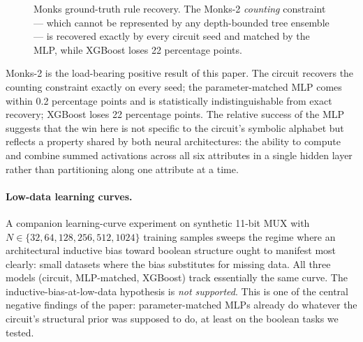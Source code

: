 \documentclass{article}
\begin{document}
\begin{figure}[H]
\centering
{}
\caption{Monks ground-truth rule recovery. The Monks-2 \emph{counting} constraint --- which cannot be represented by any depth-bounded tree ensemble --- is recovered exactly by every circuit seed and matched by the MLP, while XGBoost loses 22 percentage points.}
\label{fig:monks_bar}
\end{figure}

Monks-2 is the load-bearing positive result of this paper.
The circuit recovers the counting constraint exactly on every seed; the parameter-matched MLP comes within 0.2 percentage points and is statistically indistinguishable from exact recovery; XGBoost loses 22 percentage points.
The relative success of the MLP suggests that the win here is not specific to the circuit's symbolic alphabet but reflects a property shared by both neural architectures: the ability to compute and combine summed activations across all six attributes in a single hidden layer rather than partitioning along one attribute at a time.

\paragraph{Low-data learning curves.}
A companion learning-curve experiment on synthetic 11-bit MUX with $N \in \{32, 64, 128, 256, 512, 1024\}$ training samples sweeps the regime where an architectural inductive bias toward boolean structure ought to manifest most clearly: small datasets where the bias substitutes for missing data.
All three models (circuit, MLP-matched, XGBoost) track essentially the same curve.
The inductive-bias-at-low-data hypothesis is \emph{not supported}.
This is one of the central negative findings of the paper: parameter-matched MLPs already do whatever the circuit's structural prior was supposed to do, at least on the boolean tasks we tested.
\end{document}
